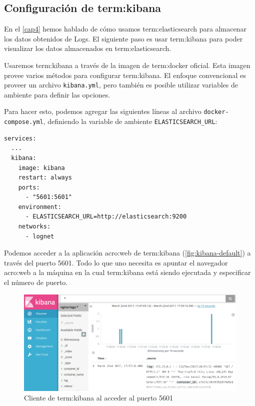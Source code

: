 \subsection{Configuración de \gls{term:kibana}}
\label{configuracion-de-kibana}

En el \autoref{cap4} hemos hablado de cómo usamos \gls{term:elasticsearch} para
almacenar los datos obtenidos de Logs. El siguiente paso es usar
\gls{term:kibana} para poder visualizar los datos almacenados en
\gls{term:elasticsearch}.

Usaremos \gls{term:kibana} a través de la imagen de \gls{term:docker} oficial.
Esta imagen provee varios métodos para configurar \gls{term:kibana}. El enfoque
convencional es proveer un archivo \lstinline{kibana.yml}, pero también es
posible utilizar variables de ambiente para definir las opciones.

Para hacer esto, podemos agregar las siguientes líneas al archivo \texttt{docker-compose.yml}, definiendo la variable de ambiente \lstinline{ELASTICSEARCH_URL}:

\begin{lstlisting}
services:
  ...
  kibana:
    image: kibana
    restart: always
    ports:
      - "5601:5601"
    environment:
      - ELASTICSEARCH_URL=http://elasticsearch:9200
    networks:
      - lognet
\end{lstlisting}

Podemos acceder a la aplicación \gls{acro:web} de \gls{term:kibana}
(\autoref{fig:kibana-default}) a través del puerto 5601. Todo lo que uno
necesita es apuntar el navegador \gls{acro:web} a la máquina en la cual
\gls{term:kibana} está siendo ejecutada y especificar el número de puerto.

\begin{figure}
  \includegraphics[width=\linewidth]{src/images/05-capitulo-5/kibanadefault.jpg}
  \caption{Cliente de \gls{term:kibana} al acceder al puerto 5601}
  \label{fig:kibana-default}
\end{figure}

